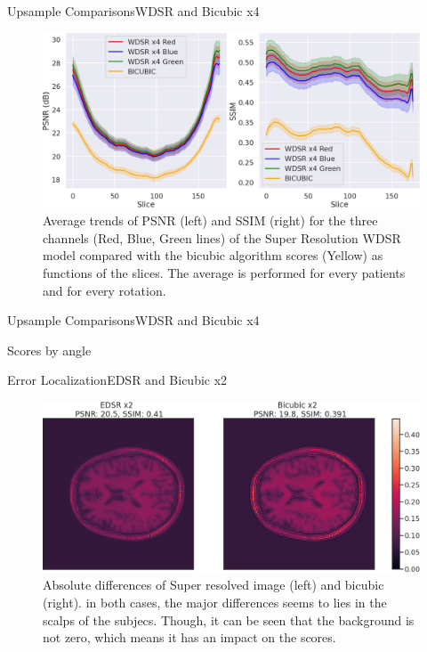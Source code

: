 \documentclass[10pt, unicode]{beamer}
\begin{document}
\begin{frame}{Upsample Comparisons}{WDSR and Bicubic x4}

\begin{figure}
\centering
\includegraphics[scale=0.21]{./images/wdsr_score_slide.png}
\caption{Average trends of PSNR (left) and SSIM (right) for the three channels (Red,
Blue, Green lines) of the Super Resolution WDSR model compared with the bicubic algorithm scores (Yellow) as functions of the slices. The average is performed for every
patients and for every rotation.}
\end{figure}
 
\end{frame}

\begin{frame}{Upsample Comparisons}{WDSR and Bicubic x4}

\end{frame}

\begin{frame}{Scores by angle}
 
\end{frame}

\begin{frame}{Error Localization}{EDSR and Bicubic x2}

\begin{figure}
 \centering
 \includegraphics[scale=0.2]{./images/diff-edsr.png}
 \caption{Absolute differences of Super resolved image (left) and bicubic (right). in
both cases, the major differences seems to lies in the scalps of the subjecs. Though, it
can be seen that the background is not zero, which means it has an impact on the scores.}
\end{figure}
\end{frame}
\end{document}
